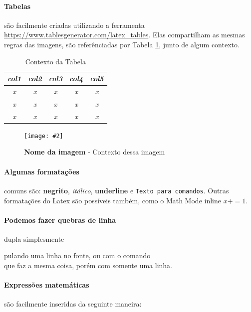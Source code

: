 \documentclass[10pt, a4paper]{article}
\newcommand{\figuremacro}[5]{
    \begin{figure}[#1]
        \centering
        \texttt{[image: \#2]}
        \caption[#3]{\textbf{#3}#4}
        \label{fig:#2}
    \end{figure}
}
\begin{document}
    \paragraph{Tabelas} são facilmente criadas utilizando a ferramenta \url{https://www.tablesgenerator.com/latex_tables}. Elas compartilham as mesmas regras das imagens, são referênciadas por Tabela \ref{tab:tabela}, junto de algum contexto.

    \begin{table}[!htb]
\centering
\begin{tabular}{ccccc}
\hline
\textit{\textbf{col1}} & \textit{\textbf{col2}} & \textit{\textbf{col3}} & \textit{\textbf{col4}} & \textit{\textbf{col5}} \\ \hline
\textit{x}             & \textit{x}             & \textit{x}             & \textit{x}             & \textit{x}             \\
\textit{x}             & \textit{x}             & \textit{x}             & \textit{x}             & \textit{x}             \\
\textit{x}             & \textit{x}             & \textit{x}             & \textit{x}             & \textit{x}             \\ \hline
\end{tabular}
\caption{Contexto da Tabela}
\label{tab:tabela}
\end{table}

    
    \figuremacro{!htb}{arquivoexemplo}{Nome da imagem}{ - Contexto dessa imagem}{1.0}
	
    \paragraph{Algumas formatações} comuns são: \textbf{negrito}, \textit{itálico}, \textbf{underline} e \texttt{Texto para comandos}. Outras formatações do Latex são possíveis também, como o Math Mode inline $x += 1$.

    \paragraph{Podemos fazer quebras de linha} dupla simplesmente

    pulando uma linha no fonte, ou com o comando \\ que faz a mesma coisa, porém com somente uma linha.
    


    \paragraph{Expressões matemáticas} são facilmente inseridas da seguinte maneira:
    
\end{document}
